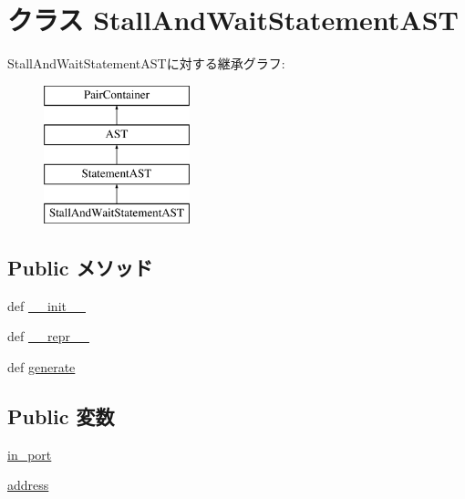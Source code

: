\hypertarget{classslicc_1_1ast_1_1StallAndWaitStatementAST_1_1StallAndWaitStatementAST}{
\section{クラス StallAndWaitStatementAST}
\label{classslicc_1_1ast_1_1StallAndWaitStatementAST_1_1StallAndWaitStatementAST}
}
StallAndWaitStatementASTに対する継承グラフ:\begin{figure}[H]
\begin{center}
\leavevmode
\includegraphics[height=4cm]{classslicc_1_1ast_1_1StallAndWaitStatementAST_1_1StallAndWaitStatementAST}
\end{center}
\end{figure}
\subsection*{Public メソッド}
\begin{DoxyCompactItemize}
\item 
def \hyperlink{classslicc_1_1ast_1_1StallAndWaitStatementAST_1_1StallAndWaitStatementAST_ac775ee34451fdfa742b318538164070e}{\_\-\_\-init\_\-\_\-}
\item 
def \hyperlink{classslicc_1_1ast_1_1StallAndWaitStatementAST_1_1StallAndWaitStatementAST_ad8b9328939df072e4740cd9a63189744}{\_\-\_\-repr\_\-\_\-}
\item 
def \hyperlink{classslicc_1_1ast_1_1StallAndWaitStatementAST_1_1StallAndWaitStatementAST_a4555d1cee0dccf3942ea35fe86de2e8e}{generate}
\end{DoxyCompactItemize}
\subsection*{Public 変数}
\begin{DoxyCompactItemize}
\item 
\hyperlink{classslicc_1_1ast_1_1StallAndWaitStatementAST_1_1StallAndWaitStatementAST_ae666920e96f9453d7c271ed6b91db103}{in\_\-port}
\item 
\hyperlink{classslicc_1_1ast_1_1StallAndWaitStatementAST_1_1StallAndWaitStatementAST_ade5a18d52133ef21f211020ceb464c07}{address}
\end{DoxyCompactItemize}


